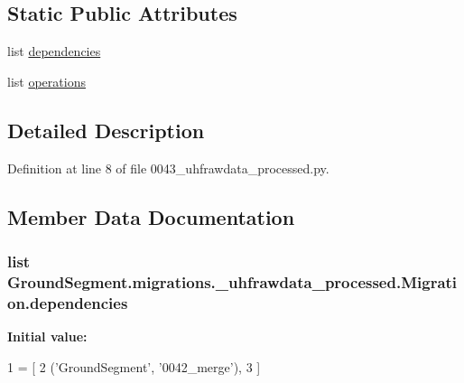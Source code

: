 \subsection*{Static Public Attributes}
\begin{DoxyCompactItemize}
\item 
list \hyperlink{class_ground_segment_1_1migrations_1_10043__uhfrawdata__processed_1_1_migration_a860a80bab322fa710897a0cf8dd68d5e}{dependencies}
\item 
list \hyperlink{class_ground_segment_1_1migrations_1_10043__uhfrawdata__processed_1_1_migration_ae2e46fcce40f3d61ac187c304782be6a}{operations}
\end{DoxyCompactItemize}


\subsection{Detailed Description}


Definition at line 8 of file 0043\+\_\+uhfrawdata\+\_\+processed.\+py.



\subsection{Member Data Documentation}
\hypertarget{class_ground_segment_1_1migrations_1_10043__uhfrawdata__processed_1_1_migration_a860a80bab322fa710897a0cf8dd68d5e}{}
\subsubsection[{dependencies}]{\setlength{\rightskip}{0pt plus 5cm}list Ground\+Segment.\+migrations.\+\_\+uhfrawdata\+\_\+processed.\+Migration.\+dependencies\hspace{0.3cm}{\ttfamily [static]}}\label{class_ground_segment_1_1migrations_1_10043__uhfrawdata__processed_1_1_migration_a860a80bab322fa710897a0cf8dd68d5e}
{\bfseries Initial value\+:}
\begin{DoxyCode}
1 = [
2         (\textcolor{stringliteral}{'GroundSegment'}, \textcolor{stringliteral}{'0042\_merge'}),
3     ]
\end{DoxyCode}



